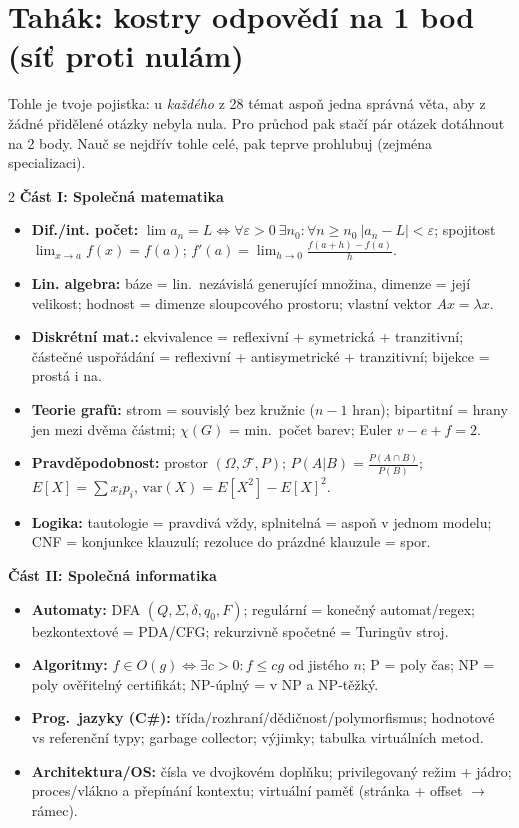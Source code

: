 \section{Tahák: kostry odpovědí na 1 bod (síť proti nulám)}

{\small Tohle je tvoje pojistka: u \emph{každého} z 28 témat aspoň jedna správná věta, aby
z žádné přidělené otázky nebyla nula. Pro průchod pak stačí pár otázek dotáhnout na 2 body.
Nauč se nejdřív tohle celé, pak teprve prohlubuj (zejména specializaci).}

\vspace{4pt}
\footnotesize
\setlength{\parskip}{1pt}

\begin{multicols}{2}
\textbf{\color{mffblue}Část I: Společná matematika}
\begin{itemize}[leftmargin=1em,itemsep=1.5pt,topsep=2pt]
  \item \textbf{Dif./int. počet:} $\lim a_n=L \iff \forall\varepsilon>0\ \exists n_0:\forall n\ge n_0\ |a_n-L|<\varepsilon$; spojitost $\lim_{x\to a}f(x)=f(a)$; $f'(a)=\lim_{h\to0}\frac{f(a+h)-f(a)}h$.
  \item \textbf{Lin. algebra:} báze = lin.\ nezávislá generující množina, dimenze = její velikost; hodnost = dimenze sloupcového prostoru; vlastní vektor $Ax=\lambda x$.
  \item \textbf{Diskrétní mat.:} ekvivalence = reflexivní + symetrická + tranzitivní; částečné uspořádání = reflexivní + antisymetrické + tranzitivní; bijekce = prostá i na.
  \item \textbf{Teorie grafů:} strom = souvislý bez kružnic ($n-1$ hran); bipartitní = hrany jen mezi dvěma částmi; $\chi(G)$ = min.\ počet barev; Euler $v-e+f=2$.
  \item \textbf{Pravděpodobnost:} prostor $(\Omega,\mathcal F,P)$; $P(A|B)=\frac{P(A\cap B)}{P(B)}$; $E[X]=\sum x_i p_i$, $\mathrm{var}(X)=E[X^2]-E[X]^2$.
  \item \textbf{Logika:} tautologie = pravdivá vždy, splnitelná = aspoň v jednom modelu; CNF = konjunkce klauzulí; rezoluce do prázdné klauzule = spor.
\end{itemize}

\textbf{\color{mffblue}Část II: Společná informatika}
\begin{itemize}[leftmargin=1em,itemsep=1.5pt,topsep=2pt]
  \item \textbf{Automaty:} DFA $(Q,\Sigma,\delta,q_0,F)$; regulární = konečný automat/regex; bezkontextové = PDA/CFG; rekurzivně spočetné = Turingův stroj.
  \item \textbf{Algoritmy:} $f\in O(g)\iff \exists c>0: f\le cg$ od jistého $n$; P = poly čas; NP = poly ověřitelný certifikát; NP-úplný = v NP a NP-těžký.
  \item \textbf{Prog.\ jazyky (C\#):} třída/rozhraní/dědičnost/polymorfismus; hodnotové vs referenční typy; garbage collector; výjimky; tabulka virtuálních metod.
  \item \textbf{Architektura/OS:} čísla ve dvojkovém doplňku; privilegovaný režim + jádro; proces/vlákno a přepínání kontextu; virtuální paměť (stránka + offset $\to$ rámec).
\end{itemize}


\end{multicols}
